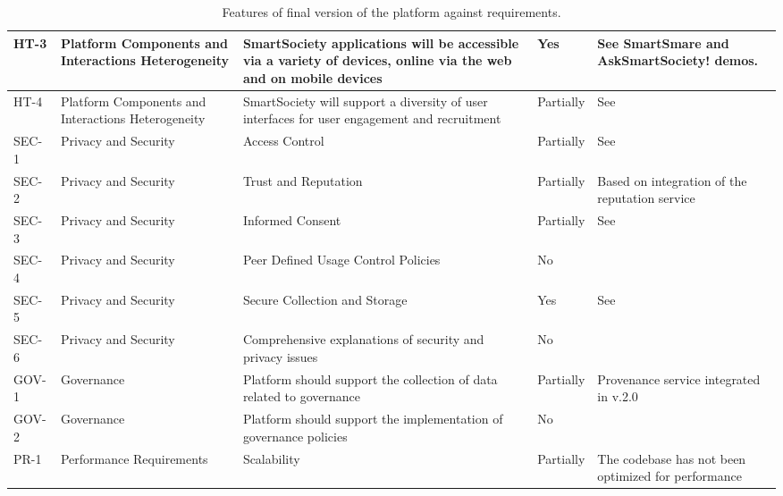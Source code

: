 \begin{sidewaystable}
{\begin{tabular}{|p{1.1cm}|p{4cm}|p{6.7cm}|p{1.5cm}|p{6.2cm}|}
HT-3  & Platform Components and Interactions Heterogeneity & SmartSociety applications will be accessible via a variety of devices, online via the web and on mobile devices & Yes & See SmartSmare and AskSmartSociety! demos.\\ \hline
HT-4  & Platform Components and Interactions Heterogeneity & SmartSociety  will support a diversity of user interfaces for user engagement and recruitment & Partially & See~\cite{D9.3}\\ \hline
SEC-1 & Privacy and Security & Access Control & Partially & See~\cite{D4.3}\\  \hline
SEC-2 &  Privacy and Security & Trust and Reputation & Partially & Based on integration of the reputation service \\ \hline
SEC-3 &  Privacy and Security & Informed Consent & Partially & See~\cite{D4.3}\\ \hline
SEC-4 &  Privacy and Security & Peer Defined Usage Control Policies & No & \\ \hline
SEC-5 &  Privacy and Security & Secure Collection and Storage & Yes & See~\cite{D4.3}\\ \hline
SEC-6 &  Privacy and Security & Comprehensive explanations of security and privacy issues & No & \\ \hline
GOV-1 & Governance & Platform should support the collection of data related to governance & Partially & Provenance service integrated in v.2.0\\ \hline
GOV-2 & Governance  & Platform should support the implementation of governance policies & No & \\ \hline
PR-1 & Performance Requirements & Scalability & Partially & The codebase has not been optimized for performance\\ \hline
\end{tabular}
}
\caption{Features of final version of the platform against requirements.}
\label{tab:req}
\end{sidewaystable}

